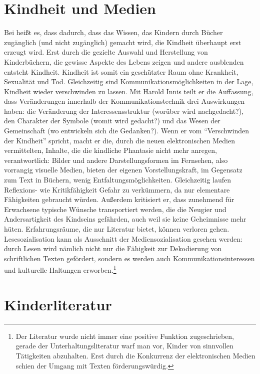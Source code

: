 \section{Kindheit und Medien}

Bei  heißt es, dass dadurch, dass das Wissen, das Kindern durch Bücher zugänglich (und nicht zugänglich) gemacht wird, die Kindheit überhaupt erst erzeugt wird. Erst durch die gezielte Auswahl und Herstellung von Kinderbüchern, die gewisse Aspekte des Lebens zeigen und andere ausblenden entsteht Kindheit. Kindheit ist somit ein geschützter Raum ohne Krankheit, Sexualität und Tod.
Gleichzeitig sind Kommunikationsmöglichkeiten in  der Lage, Kindheit wieder verschwinden zu lassen. Mit Harold Innis teilt er die Auffassung,  dass Veränderungen innerhalb der Kommunikationstechnik drei Auswirkungen haben: die Veränderung der Interessensstruktur (worüber wird nachgedacht?), den Charakter der Symbole (womit wird gedacht?) und das Wesen der Gemeinschaft (wo entwickeln sich die Gedanken?). \parencite[34]{Postman1985} Wenn er vom \enquote{Verschwinden der Kindheit} spricht, macht er die, durch die neuen elektronischen Medien vermittelten, Inhalte, die die kindliche Phantasie nicht mehr anregen, verantwortlich: Bilder und andere Darstellungsformen im Fernsehen, also vorrangig visuelle Medien, bieten der eigenen Vorstellungskraft, im Gegensatz zum Text in Büchern, wenig Entfaltungsmöglichkeiten. Gleichzeitig laufen Reflexions- wie Kritikfähigkeit Gefahr zu verkümmern, da nur elementare Fähigkeiten gebraucht würden. Außerdem kritisiert er, dass zunehmend für Erwachsene typische Wünsche transportiert werden, die die Neugier und Andersartigkeit des Kindseins gefährden, auch weil sie keine Geheimnisse mehr hüten. \parencite[93\psq]{Postman1985} Erfahrungsräume, die nur Literatur bietet, können verloren gehen. Lesesozialisation kann als Ausschnitt der Mediensozialisation gesehen werden: durch Lesen wird nämlich nicht nur die Fähigkeit zur Dekodierung von schriftlichen Texten gefördert, sondern es werden auch Kommunikationsinteressen und kulturelle Haltungen erworben.\footnote{Der Literatur wurde nicht immer eine positive Funktion zugeschrieben, gerade der Unterhaltungsliteratur warf man vor, Kinder von sinnvollen Tätigkeiten abzuhalten. Erst durch die Konkurrenz der elektronischen Medien schien der Umgang mit Texten förderungswürdig. } \parencite[22\psqq]{Weinkauff2010}

\section{Kinderliteratur} 

